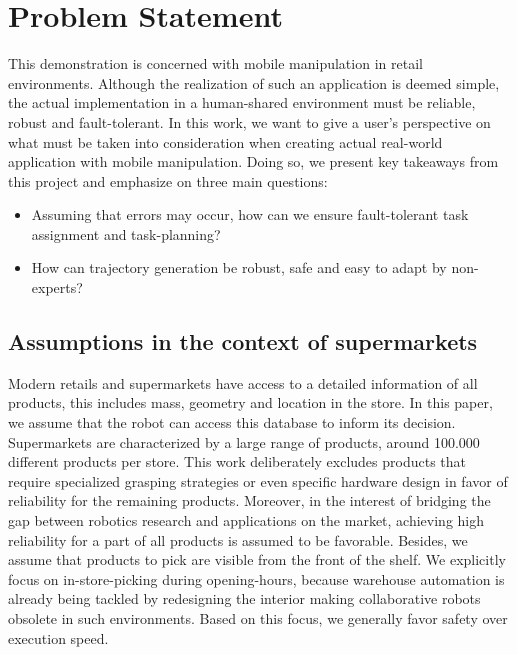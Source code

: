 \section{Problem Statement}

This demonstration is concerned with mobile manipulation in
retail environments. Although the realization of such an
application is deemed simple, the actual implementation in a
human-shared environment must be reliable, robust and
fault-tolerant. In this work, we want to give a user's
perspective on what must be taken into consideration when
creating actual real-world application with mobile
manipulation. Doing so, we present key takeaways from this
project and emphasize on three main questions:

\begin{itemize}
  \item Assuming that errors may occur, how can we ensure fault-tolerant task
  assignment and task-planning?
  \item How can trajectory generation be robust, safe and easy to adapt by
  non-experts?
\end{itemize}

\subsection{Assumptions in the context of supermarkets}

Modern retails and supermarkets have access to a detailed information of all
products, this includes mass, geometry and location in the store. In this paper,
we assume that the robot can access this database to inform its decision.
Supermarkets are characterized by a large range of products, around 100.000
different products per store.  This work deliberately excludes
 products that require specialized grasping strategies or even specific hardware design in favor of reliability for the remaining products.
Moreover, in the interest of bridging the gap between robotics research and
applications on the market, achieving high reliability for a part of all
products is assumed to be favorable. Besides, we assume that products to
pick are visible from the front of the shelf. We explicitly focus on
in-store-picking during opening-hours, because warehouse automation is already
being tackled by redesigning the interior making collaborative robots obsolete
in such environments. Based on this focus, we generally favor safety over
execution speed. 
